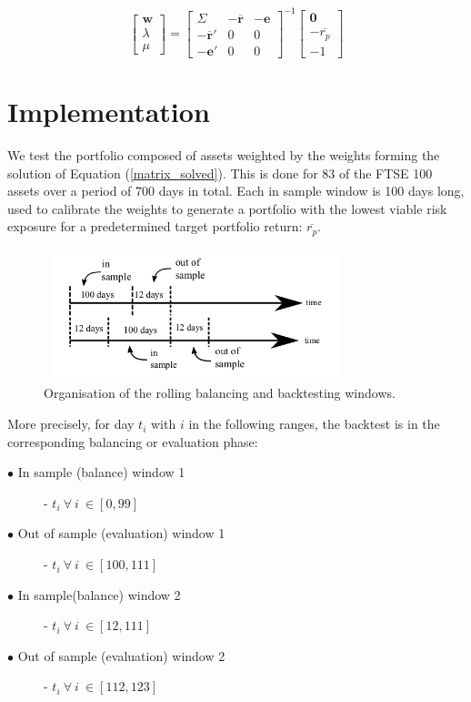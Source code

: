 \documentclass{article}
\begin{document}
\begin{equation}
\begin{bmatrix}
\textbf{w}\\
\lambda \\
\mu
\end{bmatrix}
=
\begin{bmatrix}
\Sigma & -\overline{\textbf{r}} & -\textbf{e} \\
-\overline{\textbf{r}}'  & 0 & 0 \\
-\textbf{e}' & 0 & 0 
\end{bmatrix}^{-1}
\begin{bmatrix}
\textbf{0}\\
-\overline{r_p}\\
-1
\end{bmatrix}
\label{matrix_solved}
\end{equation}


\section{Implementation}
\label{sec:implementation}



We test the portfolio composed of assets weighted by the weights forming the solution of Equation (\ref{matrix_solved}). This is done for 83 of the FTSE 100 assets over a period of 700 days in total. Each in sample window is 100 days long, used to calibrate the weights to generate a portfolio with the lowest viable risk exposure for a predetermined target portfolio return: $\overline{r_p}$. 


\begin{figure}[H]
	\centerline{\includegraphics[width=3.5in,height=1.5in]{figures/backtesting_windows.png}}
	\label{backtetsing_window}
	\caption{Organisation of the rolling balancing and backtesting windows. \cite{assignment}}
\end{figure}

More precisely, for day $t_i$ with $i$ in the following ranges, the backtest is in the corresponding balancing or evaluation phase:  

\begin{description}
	\item [$\bullet$ In sample (balance) window 1] - $t_i\:\forall\:i\:\in [0,99]$
	\item [$\bullet$ Out of sample (evaluation) window 1] - $t_i\:\forall\:i\:\in [100,111]$
	\item [$\bullet$ In sample(balance) window 2] - $t_i\:\forall\:i\:\in [12, 111]$
	\item [$\bullet$ Out of sample (evaluation) window 2] - $t_i\:\forall\:i\:\in [112, 123]$
\end{description}
\end{document}
